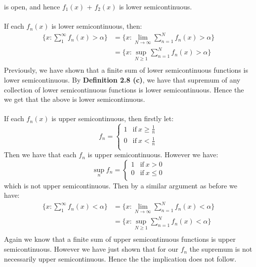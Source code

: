 \documentclass{article}
\begin{document}
is open, and hence $f_1(x)$ + $f_2(x)$ is lower semicontinuous.
\\\\
If each $f_n(x)$ is lower semicontinuous, then:
\begin{equation*}
    \begin{aligned}
        \{ x: \sum_1^\infty f_n(x) > \alpha\} &= \{ x: \lim_{N\to\infty} \sum_{n=1}^N f_n(x) > \alpha \}\\
        &= \{ x: \sup_{N \ge 1} \sum_{n=1}^N f_n(x) > \alpha \} \\
    \end{aligned}
\end{equation*}
Previously, we have shown that a finite sum of lower semicontinuous functions is lower semicontinuous.
By \textbf{Definition 2.8 (c)}, we have that supremum of any collection of lower semicontinuous functions is lower semicontinuous. Hence the we get that the above is lower semicontinuous.
\\\\
If each $f_n(x)$ is upper semicontinuous, then firstly let:
\[ f_n = 
    \begin{cases} 
        1 & \text{if} \ x \ge \frac{1}{n}\\
        0 & \text{if} \ x < \frac{1}{n}\\
    \end{cases}
\]
Then we have that each $f_n$ is upper semicontinuous. However we have:
\[ \sup_{n} f_n = 
    \begin{cases} 
        1 & \text{if} \ x > 0\\
        0 & \text{if} \ x \le 0\\
    \end{cases}
\]
which is not upper semicontinuous.
Then by a similar argument as before we have:
\begin{equation*}
    \begin{aligned}
        \{ x: \sum_1^\infty f_n(x) < \alpha\} &= \{ x: \lim_{N\to\infty} \sum_{n=1}^N f_n(x) < \alpha \}\\
        &= \{ x: \sup_{N \ge 1} \sum_{n=1}^N f_n(x) < \alpha \} \\
    \end{aligned}
\end{equation*}
Again we know that a finite sum of upper semicontinuous functions is upper semicontinuous.
However we have just shown that for our $f_n$ the supremum is not necessarily upper semicontinuous.
Hence the the implication does not follow.
\\\\
\end{document}
